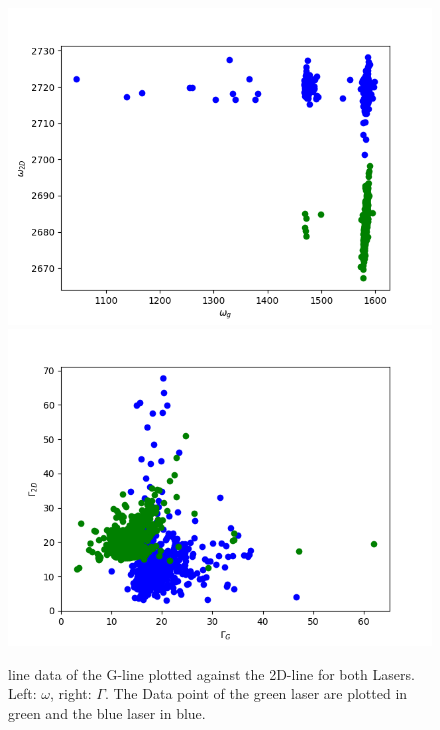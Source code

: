 \documentclass[12pt,a4paper]{article}
\begin{document}
\begin{figure}[h]
\centering
\includegraphics[scale=0.5]{Bilder/Laser/omega.png}
\includegraphics[scale=0.5]{Bilder/Laser/gamma.png}
\caption{line data of the G-line plotted against the 2D-line for both Lasers. Left: $\omega$, right: $\Gamma$. The Data point of the green laser are plotted in green and the blue laser in blue.}
\label{fig:Laser_omega}
\end{figure}
\end{document}
